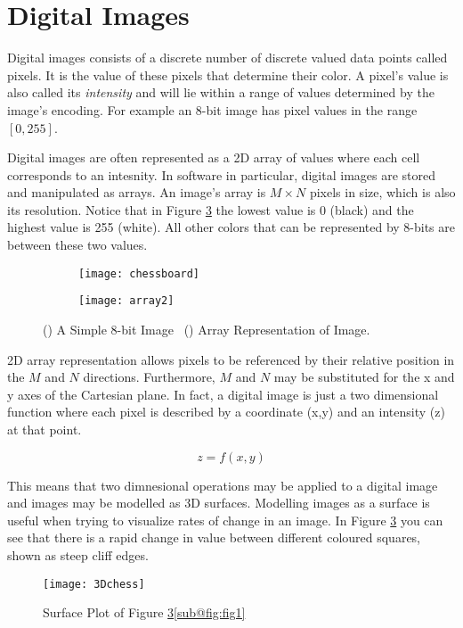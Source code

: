 \section{Digital Images}
Digital images consists of a discrete number of discrete valued data points called pixels. It is the value of these pixels that determine their color. A pixel's value is also called its \emph{intensity} and will lie within a range of values determined by the image's encoding. For example an 8-bit image has pixel values in the range $[0, 255]$. 

Digital images are often represented as a 2D array of values where each cell corresponds to an intesnity. In software in particular,  digital images are stored and manipulated as arrays. An image's array is $M\times N$ pixels in size, which is also its resolution. Notice that in Figure \ref{fig:2Darray} the lowest value is 0 (black) and the highest value is 255 (white). All other colors that can be represented by 8-bits are between these two values.

\begin{figure}[H]
    \centering
    \begin{subfigure}[b]{0.5\linewidth}
      \centering\texttt{[image: chessboard]}
      \caption{\label{fig:fig1}}
    \end{subfigure}%
    \begin{subfigure}[b]{0.5\linewidth}
      \centering\texttt{[image: array2]}
      \caption{\label{fig:fig2}}
    \end{subfigure}
    \caption{() A Simple 8-bit Image ~() Array Representation of Image.}
    \label{fig:2Darray}
\end{figure}
  

2D array representation allows pixels to be referenced by their relative position in the $M$ and $N$ directions. Furthermore, $M$ and $N$ may be substituted for the x and y axes of the Cartesian plane. In fact, a digital image is just a two dimensional function where each pixel is described by a coordinate (x,y) and an intensity (z) at that point.

\begin{equation}
    z = f(x,y)
    \label{eq:2Dfunc}
\end{equation}

This means that two dimnesional operations may be applied to a digital image and images may be modelled as 3D surfaces. Modelling images as a surface is useful when trying to visualize rates of change in an image. In Figure \ref{fig:2Darray} you can see that there is a rapid change in value between different coloured squares, shown as steep cliff edges.

\begin{figure}[ht!]
  \centering
  \centering\texttt{[image: 3Dchess]}
  \caption{\label{fig:fig1} Surface Plot of Figure \ref{fig:2Darray}\ref{sub@fig:fig1}}
\end{figure}




